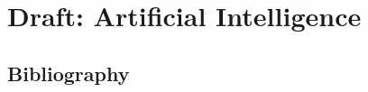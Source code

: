 \documentclass{format/laszewski}
\begin{document}








\part{Draft: Artificial Intelligence}

% 



\begin{comment}






\end{comment}

%

 

% 


\begin{comment}

\part{Appendix}



\end{comment}



\chapter*{Bibliography}


\end{document}
